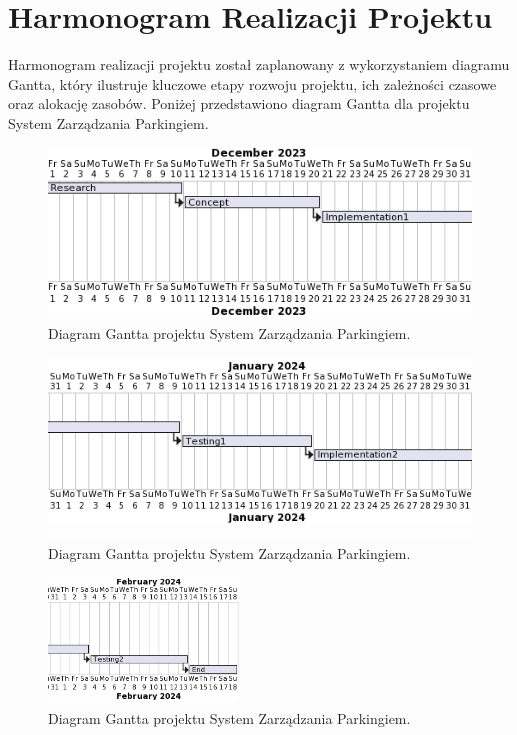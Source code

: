 \documentclass{article}
\begin{document}
\section{Harmonogram Realizacji Projektu}

Harmonogram realizacji projektu został zaplanowany z wykorzystaniem diagramu Gantta, który ilustruje kluczowe etapy rozwoju projektu, ich zależności czasowe oraz alokację zasobów. Poniżej przedstawiono diagram Gantta dla projektu System Zarządzania Parkingiem.

\begin{figure}[H]
\centering
\includegraphics[width=\textwidth]{photos/gant1.png}
\caption{Diagram Gantta projektu System Zarządzania Parkingiem.}
\end{figure}
\begin{figure}[H]
\centering
\includegraphics[width=\textwidth]{photos/gant2.png}
\caption{Diagram Gantta projektu System Zarządzania Parkingiem.}
\end{figure}
\begin{figure}[H]
\centering
\includegraphics[width=0.45\textwidth]{photos/gant3.png}
\caption{Diagram Gantta projektu System Zarządzania Parkingiem.}
\end{figure}
\end{document}
